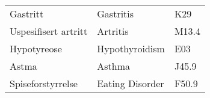 \begin{table}[H]
\begin{tabular}{|lll|}
		Gastritt                                                & Gastritis & K29                         \\
		Uspesifisert artritt                                    & Artritis & M13.4                        \\
		Hypotyreose                                             & Hypothyroidism & E03                    \\
		Astma                                                   & Asthma & J45.9                          \\
		Spiseforstyrrelse                                       & Eating Disorder & F50.9                 \\ \hline
				
		
	\end{tabular}
	
\end{table}




